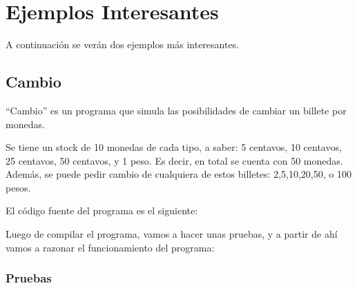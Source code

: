 \documentclass[12pt,titlepage]{article}
\begin{document}
\newpage
\section{Ejemplos Interesantes}

A continuación se verán dos ejemplos más interesantes.

\subsection{Cambio}

``Cambio'' es un programa que simula las posibilidades de cambiar un billete por monedas.

Se tiene un stock de 10 monedas de cada tipo, a saber: 5 centavos, 10 centavos, 25 centavos, 50 centavos, y 1 peso. Es decir, en total se cuenta con 50 monedas. Además, se puede pedir cambio de cualquiera de estos billetes: 2,5,10,20,50, o 100 pesos.

El código fuente del programa es el siguiente:


Luego de compilar el programa, vamos a hacer unas pruebas, y a partir de ahí vamos a razonar el funcionamiento del programa:

\subsubsection{Pruebas}
\end{document}
